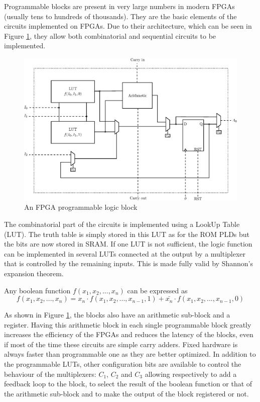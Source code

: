 Programmable blocks are present in very large numbers in modern FPGAs (usually tens to hundreds of 
thousands). They are the basic elements of the circuits implemented on FPGAs. Due to their 
architecture, which can be seen in Figure \ref{fig:fpga/fpga_block}, they allow both combinatorial 
and sequential circuits to be implemented. 

\begin{figure}[H]
    \centering
    \includegraphics[scale=0.8]{Chapter1-Hardware/res/fpga_block}
    \caption{An FPGA programmable logic block}
    \label{fig:fpga/fpga_block}
\end{figure}

The combinatorial part of the circuits is implemented using a LookUp Table (LUT). The truth table is 
simply stored in this LUT as for the ROM PLDs but the bits are now stored in SRAM. If one LUT is 
not sufficient, the logic function can be implemented in several LUTs connected at the output by a 
multiplexer that is controlled by the remaining inputs. This is made fully valid by Shannon's 
expansion theorem. 

\begin{theorem}
    Any boolean function $f(x_1, x_2, ..., x_n)$ can be expressed as 
    \begin{equation*}
        f(x_1, x_2, ..., x_n) = x_n \cdot f(x_1, x_2, ..., x_{n - 1}, 1) + \bar{x_n} \cdot 
        f(x_1, x_2, ..., x_{n - 1}, 0)
    \end{equation*}
\end{theorem}

As shown in Figure \ref{fig:fpga/fpga_block}, the blocks also have an arithmetic sub-block and a 
register. Having this arithmetic block in each single programmable block greatly increases the 
efficiency of the FPGAs and reduces the latency of the blocks, even if most of the time these circuits are 
simple carry adders. Fixed hardware is always faster than programmable one as they are better 
optimized. In addition to the programmable LUTs, other configuration bits are available to control
the behaviour of the multiplexers: $C_1$, $C_2$ and $C_3$ allowing respectively to add a feedback 
loop to the block, to select the result of the boolean function or that of the arithmetic sub-block 
and to make the output of the block registered or not.

